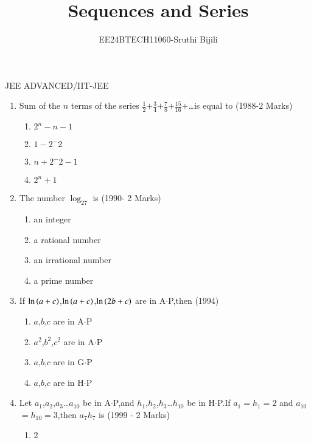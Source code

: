 \documentclass[journal,12pt,twocolumn]{IEEEtran}
\theoremstyle{remark}
\begin{document}

\vspace{3cm}
\title{Sequences and Series}
\author{EE24BTECH11060-Sruthi Bijili}
\maketitle
\newpage
\bigskip
\renewcommand{\thefigure}{\theenumi}
\renewcommand{\thetable}{\theenumi}
JEE ADVANCED/IIT-JEE\\

\begin{enumerate} [start=5]
    \item Sum of the $n$ terms of the series $\frac{1}{2}$$+$$\frac{3}{4}$$+$$\frac{7}{8}$$+$$\frac{15}{16}$$+$\dots is equal to
    \hfill(1988-2 Marks)
    \begin{enumerate}
        \item $2^n-n-1$
        \item $1-2^-2$
        \item $n+2^-2-1$
        \item $2^n+1$
         \end{enumerate}
    \item  The number $ \log_27$ is
    \hfill(1990- 2 Marks)
    \begin{enumerate}
        \item an integer
        \item a rational number
        \item an irrational number
        \item a prime number
    \end{enumerate}
    \item  If $\ln\left(a+c\right)$,$\ln\left(a+c\right)$,$\ln\left(2b+c\right)$ are in A$\cdot$P,then
    \hfill(1994)
    \begin{enumerate}
        \item $a$,$b$,$c$ are in A$\cdot$P
        \item $a^2$,$b^2$,$c^2$ are in A$\cdot$P
        \item $a$,$b$,$c$ are in G$\cdot$P
        \item $a$,$b$,$c$ are in H$\cdot$P
    \end{enumerate}
    \item Let $a_{1}$,$a_{2}$,$a_{3}$\dots$a_{10}$ be in A$\cdot$P,and $h_{1}$,$h_{2}$,$h_{3}$\dots$h_{10}$ be in H$\cdot $P.If $a_{1}$$=$$h_{1}$$=$$2$ and $a_{10}$$=$$h_{10}$$=$$3$,then $a_{7}$$h_{7}$ is
    \hfill(1999 - 2 Marks)
    \begin{enumerate}
        \item $2$

\end{enumerate}
\end{enumerate}
\end{document}
